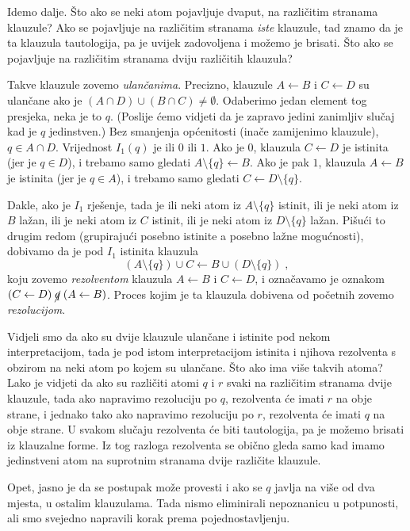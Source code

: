 Idemo dalje. Što ako se neki atom pojavljuje dvaput, na različitim stranama klauzule? Ako se pojavljuje na različitim stranama \emph{iste} klauzule, tad znamo da je ta klauzula tautologija, pa je uvijek zadovoljena i možemo je brisati. Što ako se pojavljuje na različitim stranama dviju različitih klauzula?

Takve klauzule zovemo \emph{ulančanima}. Precizno, klauzule $A\leftarrow B$ i $C\leftarrow D$ su ulančane ako je $(A\cap D)\cup(B\cap C)\not=\emptyset$. Odaberimo jedan element tog presjeka, neka je to $q$. (Poslije ćemo vidjeti da je zapravo jedini zanimljiv slučaj kad je $q$ jedinstven.) Bez smanjenja općenitosti (inače zamijenimo klauzule), $q\in A\cap D$. Vrijednost $I_1(q)$ je ili $0$ ili $1$. Ako je $0$, klauzula $C\leftarrow D$ je istinita (jer je $q\in D$), i trebamo samo gledati $A\setminus\{q\}\leftarrow B$. Ako je pak $1$, klauzula $A\leftarrow B$ je istinita (jer je $q\in A$), i trebamo samo gledati $C\leftarrow D\setminus\{q\}$.

Dakle, ako je $I_1$ rješenje, tada je ili neki atom iz $A\setminus\{q\}$ istinit, ili je neki atom iz $B$ lažan, ili je neki atom iz $C$ istinit, ili je neki atom iz $D\setminus\{q\}$ lažan. Pišući to drugim redom (grupirajući posebno istinite a posebno lažne mogućnosti), dobivamo da je pod $I_1$ istinita klauzula $$(A\setminus\{q\})\cup C\leftarrow B\cup(D\setminus\{q\})\;,$$
koju zovemo \emph{rezolventom} klauzula $A\leftarrow B$ i $C\leftarrow D$, i označavamo je oznakom $(C\leftarrow D)\;\cancel{q}\;(A\leftarrow B)$. Proces kojim je ta klauzula dobivena od početnih zovemo \emph{rezolucijom}.

Vidjeli smo da ako su dvije klauzule ulančane i istinite pod nekom interpretacijom, tada je pod istom interpretacijom istinita i njihova rezolventa s obzirom na neki atom po kojem su ulančane. Što ako ima više takvih atoma? Lako je vidjeti da ako su različiti atomi $q$ i $r$ svaki na različitim stranama dvije klauzule, tada ako napravimo rezoluciju po $q$, rezolventa će imati $r$ na obje strane, i jednako tako ako napravimo rezoluciju po $r$, rezolventa će imati $q$ na obje strane. U svakom slučaju rezolventa će biti tautologija, pa je možemo brisati iz klauzalne forme. Iz tog razloga rezolventa se obično gleda samo kad imamo jedinstveni atom na suprotnim stranama dvije različite klauzule.

Opet, jasno je da se postupak može provesti i ako se $q$ javlja na više od dva mjesta, u ostalim klauzulama. Tada nismo eliminirali nepoznanicu u potpunosti, ali smo svejedno napravili korak prema pojednostavljenju.